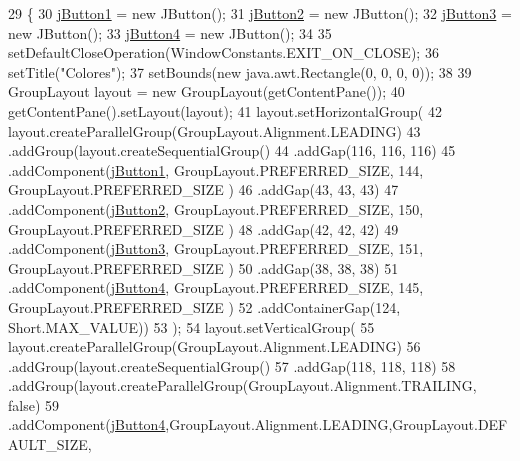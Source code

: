 \begin{DoxyCode}
29                                   \{
30         \mbox{\hyperlink{class_ejercicio6_1_1_ventana_ad44d1eb3a44301c300133e494094fa82}{jButton1}} = \textcolor{keyword}{new} JButton();
31         \mbox{\hyperlink{class_ejercicio6_1_1_ventana_a2ed2a64625ce0750faff659b6877db2a}{jButton2}} = \textcolor{keyword}{new} JButton();
32         \mbox{\hyperlink{class_ejercicio6_1_1_ventana_a5e56d7fdd53c855b57547c618c29838a}{jButton3}} = \textcolor{keyword}{new} JButton();
33         \mbox{\hyperlink{class_ejercicio6_1_1_ventana_a2ec5afa2ee7fdb55cebb1e2809f4a662}{jButton4}} = \textcolor{keyword}{new} JButton();
34  
35         setDefaultCloseOperation(WindowConstants.EXIT\_ON\_CLOSE);
36         setTitle(\textcolor{stringliteral}{"Colores"});
37         setBounds(\textcolor{keyword}{new} java.awt.Rectangle(0, 0, 0, 0));
38  
39         GroupLayout layout = \textcolor{keyword}{new} GroupLayout(getContentPane());
40         getContentPane().setLayout(layout);
41         layout.setHorizontalGroup(
42             layout.createParallelGroup(GroupLayout.Alignment.LEADING)
43             .addGroup(layout.createSequentialGroup()
44                 .addGap(116, 116, 116)
45                 .addComponent(\mbox{\hyperlink{class_ejercicio6_1_1_ventana_ad44d1eb3a44301c300133e494094fa82}{jButton1}}, GroupLayout.PREFERRED\_SIZE, 144, GroupLayout.PREFERRED\_SIZE
      )
46                 .addGap(43, 43, 43)
47                 .addComponent(\mbox{\hyperlink{class_ejercicio6_1_1_ventana_a2ed2a64625ce0750faff659b6877db2a}{jButton2}}, GroupLayout.PREFERRED\_SIZE, 150, GroupLayout.PREFERRED\_SIZE
      )
48                 .addGap(42, 42, 42)
49                 .addComponent(\mbox{\hyperlink{class_ejercicio6_1_1_ventana_a5e56d7fdd53c855b57547c618c29838a}{jButton3}}, GroupLayout.PREFERRED\_SIZE, 151, GroupLayout.PREFERRED\_SIZE
      )
50                 .addGap(38, 38, 38)
51                 .addComponent(\mbox{\hyperlink{class_ejercicio6_1_1_ventana_a2ec5afa2ee7fdb55cebb1e2809f4a662}{jButton4}}, GroupLayout.PREFERRED\_SIZE, 145, GroupLayout.PREFERRED\_SIZE
      )
52                 .addContainerGap(124, Short.MAX\_VALUE))
53         );
54         layout.setVerticalGroup(
55             layout.createParallelGroup(GroupLayout.Alignment.LEADING)
56             .addGroup(layout.createSequentialGroup()
57                 .addGap(118, 118, 118)
58                 .addGroup(layout.createParallelGroup(GroupLayout.Alignment.TRAILING, \textcolor{keyword}{false})
59                    .addComponent(\mbox{\hyperlink{class_ejercicio6_1_1_ventana_a2ec5afa2ee7fdb55cebb1e2809f4a662}{jButton4}},GroupLayout.Alignment.LEADING,GroupLayout.DEFAULT\_SIZE, 

\end{DoxyCode}
